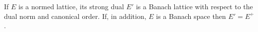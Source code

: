 If $E$ is a normed lattice, its strong dual $E'$ is a Banach lattice with respect to the dual norm and canonical order. If, in addition, $E$ is a Banach space then $E' = E^+$.
